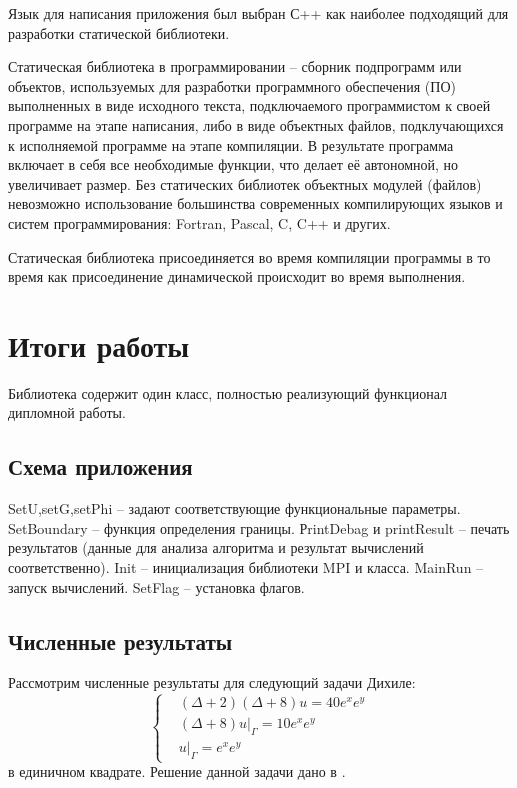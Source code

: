 Язык для написания приложения был выбран С++ как наиболее подходящий для разработки статической библиотеки.

Статическая библиотека в программировании -- сборник подпрограмм или объектов, используемых для разработки программного обеспечения (ПО) выполненных в виде исходного текста, подключаемого программистом к своей программе на этапе написания, либо в виде объектных файлов, подклучающихся к исполняемой программе на этапе компиляции. В результате программа включает в себя все необходимые функции, что делает её автономной, но увеличивает размер. Без статических библиотек объектных модулей (файлов) невозможно использование большинства современных компилирующих языков и систем программирования: Fortran, Pascal, C, C++ и других.

Статическая библиотека присоединяется во время компиляции программы в то время как присоединение динамической происходит во время выполнения.

\chapter{Итоги работы}
Библиотека содержит один класс, полностью реализующий функционал дипломной работы.  
\section{Схема приложения}
\begin{spacing}{0.9}

\end{spacing}
SetU,setG,setPhi -- задают соответствующие функциональные параметры.
SetBoundary -- функция определения границы.
РrintDebag и printResult -- печать результатов (данные для анализа алгоритма и результат вычислений соответственно).
Init -- инициализация библиотеки MPI и класса.
MainRun -- запуск вычислений.
SetFlag -- установка флагов.
\section{Численные результаты}
Рассмотрим численные результаты для следующий задачи Дихиле:
\begin{equation} 
	\left\{
\begin{aligned}
& (\Delta + 2) (\Delta +8) u = 40e^{x}e^{y}\\ & (\Delta +8) u|_{\Gamma} = 10e^{x}e^{y}\\&u|_{\Gamma} = e^{x}e^{y}
\end{aligned}
 \right. \end{equation}
{}
в единичном квадрате. Решение данной задачи дано в \cite{luk:dis}.

